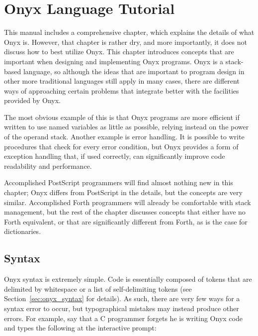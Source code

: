 %
%
%
%
%

\clearemptydoublepage
\chapter{Onyx Language Tutorial}
\label{onyxtut}

This manual includes a comprehensive 
chapter, which explains the details of what Onyx is.  However, that chapter is
rather dry, and more importantly, it does not discuss how to best utilize Onyx.
This chapter introduces concepts that are important when designing and
implementing Onyx programs.  Onyx is a stack-based language, so although the
ideas that are important to program design in other more traditional languages
still apply in many cases, there are different ways of approaching certain
problems that integrate better with the facilities provided by Onyx.

The most obvious example of this is that Onyx programs are more efficient if
written to use named variables as little as possible, relying instead on the
power of the operand stack.  Another example is error handling.  It is possible
to write procedures that check for every error condition, but Onyx provides a
form of exception handling that, if used correctly, can significantly improve
code readability and performance.

Accomplished PostScript programmers will find almost nothing new in this
chapter; Onyx differs from PostScript in the details, but the concepts are very
similar.  Accomplished Forth programmers will already be comfortable with stack
management, but the rest of the chapter discusses concepts that either have no
Forth equivalent, or that are significantly different from Forth, as is the case
for dictionaries.

\section{Syntax}

Onyx syntax is extremely simple.  Code is essentially composed of tokens that
are delimited by whitespace or a list of self-delimiting tokens (see
Section~\ref{sec:onyx_syntax} for details).  As such, there are very few ways
for a syntax error to occur, but typographical mistakes may instead produce
other errors.  For example, say that a C programmer forgets he is writing Onyx
code and types the following at the interactive  prompt:

